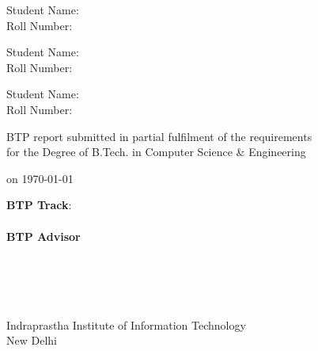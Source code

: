 

\newcommand{\condBreak}[1]{\ifx#1\empty\else \\ \fi }

\hypersetup{allcolors=black}

\begin{titlepage}
    \begin{center}
        {\huge \bf \projTitle}
        \vspace{.3in}

            {\Large{Student Name: \projAuthorOneName}} \\
            {\large{Roll Number: \projAuthorOneRollno}} \\
        \vspace{.1in}

        \ifdefined\twoAuthor
            {\Large{Student Name: \projAuthorTwoName}} \\
            {\large{Roll Number: \projAuthorTwoRollno}} \\
        \fi

        \ifdefined\threeAuthor
            \vspace{.05in}
            {\Large{Student Name: \projAuthorThreeName}} \\
            {\large{Roll Number: \projAuthorThreeRollno}} \\
        \fi

        \vspace{1.3in}

        {BTP report submitted in partial fulfilment of the requirements
            \\for the Degree of B.Tech. in Computer Science \& Engineering}

        {on \today \\}

        \vspace{.65in}

        \textbf{BTP Track}: \btptrack\\
        \quad\\

        {\textbf{BTP Advisor} \\
            \advisorone            \condBreak{\advisortwo}
            \advisortwo            \condBreak{\advisorthree}
            \advisorthree          \condBreak{\advisorfour}
            \advisorfour           \\
        }

        \vspace{3in}

        {Indraprastha Institute of Information Technology\\
            New Delhi}

    \end{center}
\end{titlepage}

\hypersetup{
    colorlinks=true,
    linkcolor=blue,
    filecolor=blue,
    urlcolor=black,
    citecolor=blue,
}
